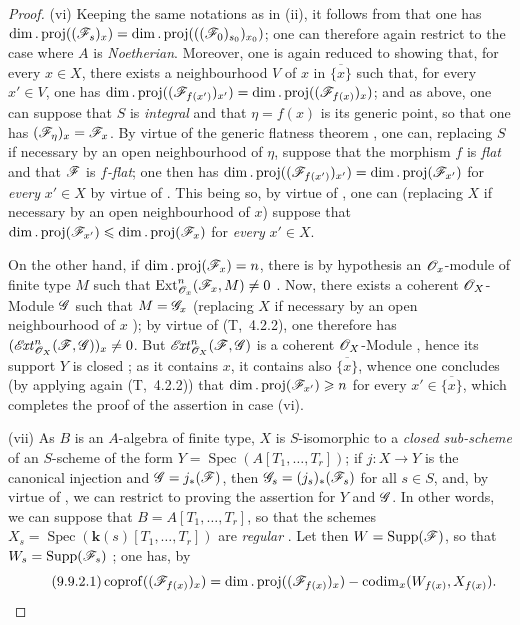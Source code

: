 \begin{proof}
(vi) Keeping the same notations as in (ii), it follows from  that one has
$\dim.\operatorname{proj}((\mathscr{F}_s)_x)=\dim.\operatorname{proj}(((\mathscr{F}_0)_{s_0})_{x_0})$;
one can therefore again restrict to the case where $A$ is \emph{Noetherian}. Moreover, one is again reduced to showing that, for every $x\in X$, there exists a neighbourhood $V$ of $x$ in $\overline{\{x\}}$ such that, for every $x'\in V$, one has
$\dim.\operatorname{proj}((\mathscr{F}_{f(x')})_{x'})=\dim.\operatorname{proj}((\mathscr{F}_{f(x)})_x)$;
and as above, one can suppose that $S$ is \emph{integral} and that $\eta=f(x)$ is its generic point, so that one has $(\mathscr{F}_\eta)_x=\mathscr{F}_x$. By virtue of the generic flatness theorem , one can, replacing $S$ if necessary by an open neighbourhood of $\eta$, suppose that the morphism $f$ is \emph{flat} and that $\mathscr{F}$ is \emph{$f$-flat}; one then has
$\dim.\operatorname{proj}((\mathscr{F}_{f(x')})_{x'})=\dim.\operatorname{proj}(\mathscr{F}_{x'})$ for \emph{every} $x'\in X$ by virtue of . This being so, by virtue of , one can (replacing $X$ if necessary by an open neighbourhood of $x$) suppose that
$\dim.\operatorname{proj}(\mathscr{F}_{x'})\leqslant\dim.\operatorname{proj}(\mathscr{F}_x)$ for \emph{every} $x'\in X$.

On the other hand, if $\dim.\operatorname{proj}(\mathscr{F}_x)=n$, there is by hypothesis an $\mathscr{O}_x$-module of finite type $M$ such that $\operatorname{Ext}^n_{\mathscr{O}_x}(\mathscr{F}_x,M)\neq 0$ .
Now, there exists a coherent $\mathscr{O}_X$-Module $\mathscr{G}$ such that $M=\mathscr{G}_x$ (replacing $X$ if necessary by an open neighbourhood of $x$ );
by virtue of (T,~4.2.2), one therefore has $(\mathscr{E}\!\mathit{xt}^n_{\mathscr{O}_X}(\mathscr{F},\mathscr{G}))_x\neq 0$.
But $\mathscr{E}\!\mathit{xt}^n_{\mathscr{O}_X}(\mathscr{F},\mathscr{G})$ is a coherent $\mathscr{O}_X$-Module , hence its support $Y$ is closed ; as it contains $x$, it contains also $\overline{\{x\}}$, whence one concludes (by applying again (T,~4.2.2)) that $\dim.\operatorname{proj}(\mathscr{F}_{x'})\geqslant n$ for every $x'\in\overline{\{x\}}$, which completes the proof of the assertion in case (vi).

(vii) As $B$ is an $A$-algebra of finite type, $X$ is $S$-isomorphic to a \emph{closed sub-scheme} of an $S$-scheme of the form $Y=\operatorname{Spec}(A[T_1,\ldots,T_r])$; if $j:X\to Y$ is the canonical injection and $\mathscr{G}=j_*(\mathscr{F})$, then $\mathscr{G}_s=(j_s)_*(\mathscr{F}_s)$ for all $s\in S$, and, by virtue of , we can restrict to proving the assertion for $Y$ and $\mathscr{G}$.
In other words, we can suppose that $B=A[T_1,\ldots,T_r]$, so that the schemes $X_s=\operatorname{Spec}(\boldsymbol{k}(s)[T_1,\ldots,T_r])$ are \emph{regular} .
Let then $W=\operatorname{Supp}(\mathscr{F})$, so that $W_s=\operatorname{Supp}(\mathscr{F}_s)$ ; one has, by 
\begin{equation}
\tag{9.9.2.1}
\label{IV.9.9.2.1}
  \operatorname{coprof}((\mathscr{F}_{f(x)})_x)=\dim.\operatorname{proj}((\mathscr{F}_{f(x)})_x)-\operatorname{codim}_x(W_{f(x)},X_{f(x)}).
\end{equation}


\end{proof}
